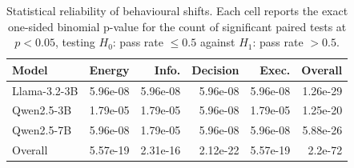 \begin{table}[t]
\centering
\caption{Statistical reliability of behavioural shifts. Each cell reports the exact one-sided binomial p-value for the count of significant paired tests at $p<0.05$, testing $H_0$: pass rate $\leq 0.5$ against $H_1$: pass rate $>0.5$.}
\begin{tabular}{lrrrrr}
\toprule
Model & Energy & Info. & Decision & Exec. & Overall \\
\midrule
Llama-3.2-3B & 5.96e-08 & 5.96e-08 & 5.96e-08 & 5.96e-08 & 1.26e-29 \\
Qwen2.5-3B & 1.79e-05 & 1.79e-05 & 5.96e-08 & 1.79e-05 & 1.25e-20 \\
Qwen2.5-7B & 5.96e-08 & 1.79e-05 & 5.96e-08 & 5.96e-08 & 5.88e-26 \\
\midrule
Overall & 5.57e-19 & 2.31e-16 & 2.12e-22 & 5.57e-19 & 2.2e-72 \\
\bottomrule
\end{tabular}
\end{table}
